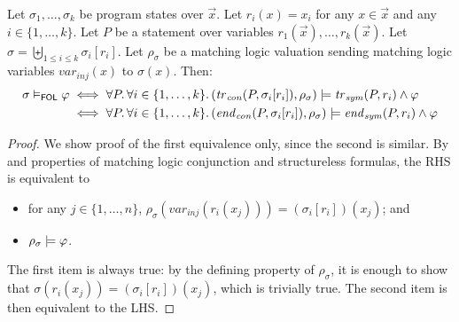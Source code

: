 \begin{lemma}\label{lem:chlCRLstatic}
    Let $\sigma_1,\ldots,\sigma_k$ be program states over $\vec{x}$.
    Let $r_i(x) = x_i$ for any $x \in \vec{x}$ and any $i \in \{ 1, \ldots, k \}$.
    Let $P$ be a statement over variables $r_1(\vec{x}), \ldots, r_k(\vec{x})$.
    Let $\sigma = \biguplus_{1 \leq i \leq k} \sigma_i[r_i]$.
    Let $\rho_\sigma$ be a matching logic valuation sending matching logic variables
    $\mathit{var}_{\mathit{inj}}(x)$ to $\sigma(x)$.
    Then:
    \begin{align*}
        \sigma \vDash_{\mathsf{FOL}} \varphi
        & \iff \forall P.\, \forall i \in \{ 1, \ldots, k \} . \,
        (\mathit{tr}_{\mathit{con}}(P, \sigma_i[r_i]), \rho_\sigma)
        \models \mathit{tr}_{\mathit{sym}}(P, r_i) \land \varphi \\
        & \iff \forall P.\, \forall i \in \{ 1, \ldots, k \} . \,
        (\mathit{end}_{\mathit{con}}(P, \sigma_i[r_i]), \rho_\sigma)
        \models \mathit{end}_{\mathit{sym}}(P, r_i) \land \varphi
    \end{align*}
\end{lemma}
\begin{proof}
    We show proof of the first equivalence only, since the second is similar.
    By  and properties of matching logic conjunction and structureless formulas,
    the RHS is equivalent to
    \begin{proofenv}
        \begin{itemize}
            \item for any $j \in \{ 1,\ldots,n \}$,
            $\rho_{\sigma}(\mathit{var}_{\mathit{inj}}(r_i(x_j))) = (\sigma_i[r_i])(x_j)$; and
            \item $\rho_\sigma \models \varphi$.
        \end{itemize}
    \end{proofenv}
    The first item is always true: by the defining property of $\rho_{\sigma}$,
    it is enough to show that $\sigma(r_i(x_j)) = (\sigma_i[r_i])(x_j)$, which is trivially true.
    The second item is then equivalent to the LHS.
\end{proof}



